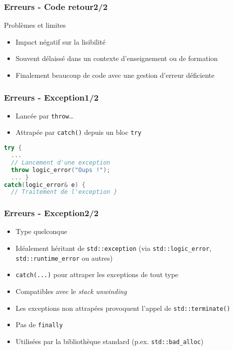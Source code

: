 \documentclass[C++.tex]{subfiles}
\begin{document}
\begin{frame}
	\frametitle{Erreurs -  Code retour\titlehfill{}2/2}
	\begin{alertblock}{Problèmes et limites}
		\begin{itemize}
			\item Impact négatif sur la lisibilité
			\item Souvent délaissé dans un contexte d'enseignement ou de formation
			\item Finalement beaucoup de code avec une gestion d'erreur déficiente
		\end{itemize}
	\end{alertblock}
\end{frame}

\begin{frame}[fragile]
	\frametitle{Erreurs - Exception\titlehfill{}1/2}
	\begin{itemize}
		\item Lancée par \lstinline|throw|\dots{}
		\item Attrapée par \lstinline|catch()| depuis un bloc \lstinline|try|
	\end{itemize}

	\begin{lstlisting}[language=C++]
try {
  ...
  // Lancement d'une exception
  throw logic_error("Oups !");
  ... }
catch(logic_error& e) {
  // Traitement de l'exception }\end{lstlisting}
\end{frame}

\begin{frame}
	\frametitle{Erreurs - Exception\titlehfill{}2/2}
	\begin{itemize}
		\item Type quelconque
		\item Idéalement héritant de \lstinline|std::exception| (via \lstinline|std::logic_error|, \lstinline|std::runtime_error| ou autres)
		\item \lstinline|catch(...)| pour attraper les exceptions de tout type
		\item Compatibles avec le \textit{stack unwinding}


		\item Les exceptions non attrapées provoquent l'appel de \lstinline|std::terminate()|


		\item Pas de \lstinline[keywordstyle=\color{black}]|finally|
		\item Utilisées par la bibliothèque standard (p.ex. \lstinline|std::bad_alloc|)
	\end{itemize}
\end{frame}
\end{document}
